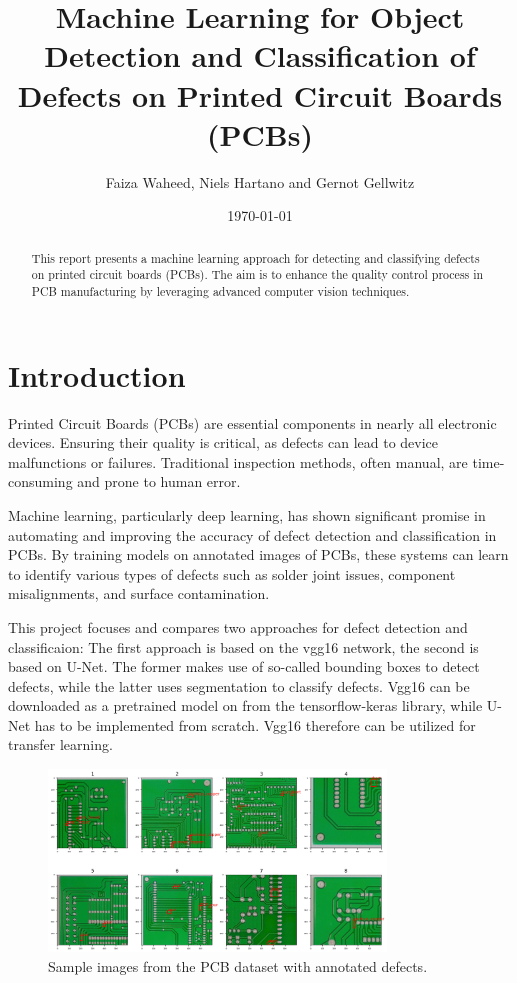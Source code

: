 \documentclass[12pt]{article}
\title{Machine Learning for Object Detection and Classification of Defects on Printed Circuit Boards (PCBs)}
\author{Faiza Waheed, Niels Hartano and Gernot Gellwitz}
\date{\today}
\begin{document}
\maketitle

\begin{abstract}
This report presents a machine learning approach for detecting and classifying defects on printed circuit boards (PCBs). The aim is to enhance the quality control process in PCB manufacturing by leveraging advanced computer vision techniques.
\end{abstract}

\section{Introduction}
Printed Circuit Boards (PCBs) are essential components in nearly all electronic devices. Ensuring their quality is critical, as defects can lead to device malfunctions or failures. Traditional inspection methods, often manual, are time-consuming and prone to human error. 

Machine learning, particularly deep learning, has shown significant promise in automating and improving the accuracy of defect detection and classification in PCBs. By training models on annotated images of PCBs, these systems can learn to identify various types of defects such as solder joint issues, component misalignments, and surface contamination.

This project focuses and compares two approaches for defect detection and classificaion: The first approach is based on the vgg16 network, the second is 
based on U-Net. The former makes use of so-called bounding boxes to detect defects, while the latter uses segmentation to classify defects.
Vgg16 can be downloaded as a pretrained model on from the tensorflow-keras library, while U-Net has to be implemented from scratch. Vgg16 therefore can be utilized for transfer learning.

\begin{figure}[h]
    \centering
    \includegraphics[width=0.8\textwidth]{./graphics/4.png}
    \caption{Sample images from the PCB dataset with annotated defects.}
\end{figure}
\end{document}
